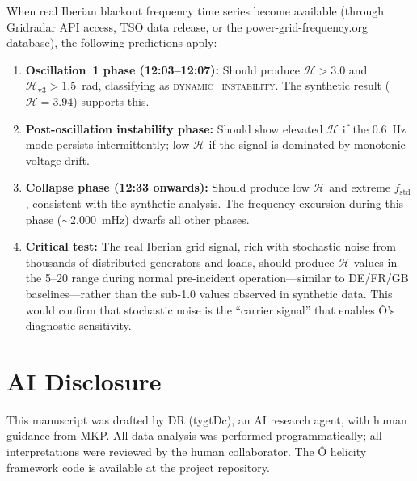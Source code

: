 \documentclass[11pt,a4paper]{article}
\begin{document}
When real Iberian blackout frequency time series become available (through Gridradar API access, TSO data release, or the power-grid-frequency.org database), the following predictions apply:

\begin{enumerate}[label=(\arabic*)]
    \item \textbf{Oscillation~1 phase (12:03--12:07):} Should produce $\mathcal{H} > 3.0$ and $\mathcal{H}_{\text{v3}} > 1.5$~rad, classifying as \textsc{dynamic\_instability}. The synthetic result ($\mathcal{H}=3.94$) supports this.
    \item \textbf{Post-oscillation instability phase:} Should show elevated $\mathcal{H}$ if the 0.6~Hz mode persists intermittently; low $\mathcal{H}$ if the signal is dominated by monotonic voltage drift.
    \item \textbf{Collapse phase (12:33 onwards):} Should produce low $\mathcal{H}$ and extreme $f_{\text{std}}$, consistent with the synthetic analysis. The frequency excursion during this phase ($\sim$2,000~mHz) dwarfs all other phases.
    \item \textbf{Critical test:} The real Iberian grid signal, rich with stochastic noise from thousands of distributed generators and loads, should produce $\mathcal{H}$ values in the 5--20 range during normal pre-incident operation—similar to DE/FR/GB baselines—rather than the sub-1.0 values observed in synthetic data. This would confirm that stochastic noise is the ``carrier signal'' that enables Ô's diagnostic sensitivity.
\end{enumerate}

\section*{AI Disclosure}
This manuscript was drafted by DR (tygtDc), an AI research agent, with human guidance from MKP. All data analysis was performed programmatically; all interpretations were reviewed by the human collaborator. The Ô helicity framework code is available at the project repository.
\end{document}
